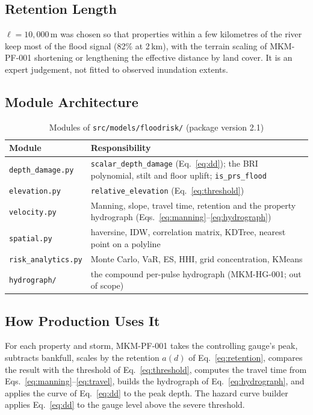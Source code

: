 \documentclass[11pt,a4paper]{article}
\begin{document}
\subsection{Retention Length}
$\ell=10{,}000$\,m was chosen so that properties within a few kilometres of the river
keep most of the flood signal (82\% at 2\,km), with the terrain scaling of MKM-PF-001
shortening or lengthening the effective distance by land cover. It is an expert
judgement, not fitted to observed inundation extents.

\mkmimplementation

\subsection{Module Architecture}
\begin{table}[H]
\centering
\small
\begin{tabular}{lp{95mm}}
    \toprule
    \textbf{Module} & \textbf{Responsibility} \\
    \midrule
    \texttt{depth\_damage.py} & \texttt{scalar\_depth\_damage} (Eq.~\ref{eq:dd}); the BRI
        polynomial, stilt and floor uplift; \texttt{is\_prs\_flood} \\
    \texttt{elevation.py} & \texttt{relative\_elevation} (Eq.~\ref{eq:threshold}) \\
    \texttt{velocity.py} & Manning, slope, travel time, retention and the property
        hydrograph (Eqs.~\ref{eq:manning}--\ref{eq:hydrograph}) \\
    \texttt{spatial.py} & haversine, IDW, correlation matrix, KDTree, nearest point on
        a polyline \\
    \texttt{risk\_analytics.py} & Monte Carlo, VaR, ES, HHI, grid concentration, KMeans \\
    \texttt{hydrograph/} & the compound per-pulse hydrograph (MKM-HG-001; out of scope) \\
    \bottomrule
\end{tabular}
\caption{Modules of \texttt{src/models/floodrisk/} (package version 2.1)}
\label{tab:modules}
\end{table}

\subsection{How Production Uses It}
For each property and storm, MKM-PF-001 takes the controlling gauge's peak, subtracts
bankfull, scales by the retention $a(d)$ of Eq.~\eqref{eq:retention}, compares the
result with the threshold of Eq.~\eqref{eq:threshold}, computes the travel time from
Eqs.~\eqref{eq:manning}--\eqref{eq:travel}, builds the hydrograph of
Eq.~\eqref{eq:hydrograph}, and applies the curve of Eq.~\eqref{eq:dd} to the peak depth.
The hazard curve builder applies Eq.~\eqref{eq:dd} to the gauge level above the severe
threshold.
\end{document}
